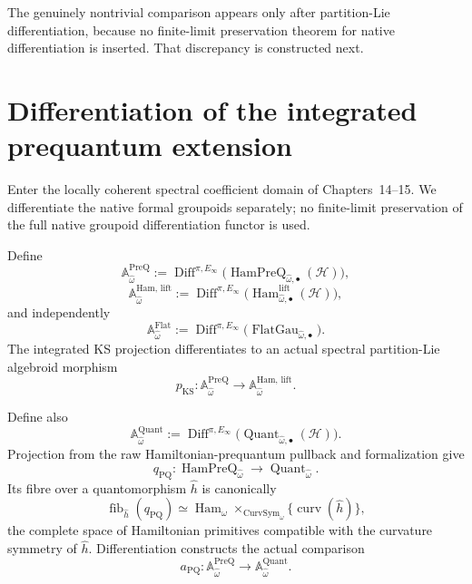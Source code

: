 The genuinely nontrivial comparison appears only after partition-Lie
differentiation, because no finite-limit preservation theorem for native
differentiation is inserted.  That discrepancy is constructed next.

\section{Differentiation of the integrated prequantum extension}
\label{sec:prequantum-differentiation-quantomorphism}

Enter the locally coherent spectral coefficient domain of Chapters~14--15.  We
differentiate the native formal groupoids separately; no finite-limit preservation
of the full native groupoid differentiation functor is used.

\begin{definition}
\label{def:prequantum-quantomorphism-controller}
Define
\[
\boxed{
\mathbb A_{\widehat\omega}^{\mathrm{PreQ}}
:=
\operatorname{Diff}^{\pi,E_\infty}
\bigl(\operatorname{HamPreQ}_{\widehat\omega,\bullet}(\mathcal H)\bigr),
}
\]
\[
\boxed{
\mathbb A_{\widehat\omega}^{\mathrm{Ham,\,lift}}
:=
\operatorname{Diff}^{\pi,E_\infty}
\bigl(\operatorname{Ham}^{\mathrm{lift}}_{\widehat\omega,\bullet}(\mathcal H)\bigr),
}
\]
and independently
\[
\boxed{
\mathbb A_{\widehat\omega}^{\mathrm{Flat}}
:=
\operatorname{Diff}^{\pi,E_\infty}
\bigl(\operatorname{FlatGau}_{\widehat\omega,\bullet}\bigr).
}
\]
The integrated KS projection differentiates to an actual spectral partition-Lie
algebroid morphism
\[
p_{\mathrm{KS}}:
\mathbb A_{\widehat\omega}^{\mathrm{PreQ}}
\longrightarrow
\mathbb A_{\widehat\omega}^{\mathrm{Ham,\,lift}}.
\]
\end{definition}

Define also
\[
\mathbb A_{\widehat\omega}^{\mathrm{Quant}}
:=
\operatorname{Diff}^{\pi,E_\infty}
\bigl(\operatorname{Quant}_{\widehat\omega,\bullet}(\mathcal H)\bigr).
\]
Projection from the raw Hamiltonian-prequantum pullback and formalization give
\[
q_{\mathrm{PQ}}:
\operatorname{HamPreQ}_{\widehat\omega}
\longrightarrow
\operatorname{Quant}_{\widehat\omega}.
\]
Its fibre over a quantomorphism $\widehat h$ is canonically
\[
\boxed{
\operatorname{fib}_{\widehat h}(q_{\mathrm{PQ}})
\simeq
\operatorname{Ham}_{\omega}
\times_{\operatorname{CurvSym}_{\omega}}
\{\operatorname{curv}(\widehat h)\},
}
\]
the complete space of Hamiltonian primitives compatible with the curvature
symmetry of $\widehat h$.  Differentiation constructs the actual comparison
\[
\boxed{
a_{\mathrm{PQ}}:
\mathbb A_{\widehat\omega}^{\mathrm{PreQ}}
\longrightarrow
\mathbb A_{\widehat\omega}^{\mathrm{Quant}}.
}
\]

